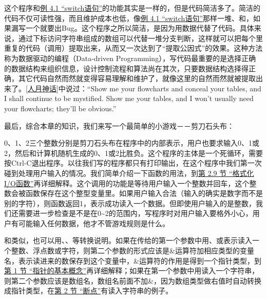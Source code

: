这个程序和\hyperlink{db.ch04s04.id2719574}{例 4.\BookSplit{}1 “switch语句”}的功能其实是一样的，但是代码简洁多了。简洁的代码不仅可读性强，而且维护成本也低，像\hyperlink{db.ch04s04.id2719574}{例 4.\BookSplit{}1 “switch语句”}那样一堆、和，如果漏写一个就要出Bug。这个程序之所以简洁，是因为用数据代替了代码。具体来说，通过下标访问字符串组成的数组可以代替一堆分支判断，这样就可以把每个里重复的代码（调用）提取出来，从而又一次达到了“提取公因式”的效果。这种方法称为数据驱动的编程（Data-driven Programming），写代码最重要的是选择正确的数据结构来组织信息，设计控制流程和算法尚在其次，只要数据结构选择得正确，其它代码自然而然就变得容易理解和维护了，就像这里的自然而然就被提取出来了。\hyperlink{db.bi01.bibli.manmonth}{[人月神话]}中说过：“Show me your flowcharts and conceal your tables, and I shall continue to be mystified.\BookSplit{} Show me your tables, and I won't usually need your flowcharts; they'll be obvious.\BookSplit{}”



最后，综合本章的知识，我们来写一个最简单的小游戏－－剪刀石头布：





0、1、2三个整数分别是剪刀石头布在程序中的内部表示，用户也要求输入0、1或2，然后和计算机随机生成的0、1或2比胜负。这个程序的主体是一个死循环，需要按Ctrl-C退出程序。以往我们写的程序都只有打印输出，在这个程序中我们第一次碰到处理用户输入的情况。我们简单介绍一下函数的用法，到\hyperlink{db.ch25s02.id2832755}{第 2.\BookSplit{}9 节 “格式化I/\BookSplit{}O函数”}再详细解释。这个调用的功能是等待用户输入一个整数并回车，这个整数会被函数保存在这个整型变量里。如果用户输入合法（输入的确实是数字而不是别的字符），则函数返回1，表示成功读入一个数据。但即使用户输入的是整数，我们还需要进一步检查是不是在0\textasciitilde{}\BookSplit{}2的范围内，写程序时对用户输入要格外小心，用户有可能输入任何数据，他才不管游戏规则是什么。



和类似，也可以用、、等转换说明。如果在传给的第一个参数中用、或表示读入一个整数、浮点数或字符，则第二个参数的形式应该是\&运算符加相应类型的变量名，表示读进来的数保存到这个变量中，\&运算符的作用是得到一个指针类型，到\hyperlink{db.ch23s01.id2809880}{第 1 节 “指针的基本概念”}再详细解释；如果在第一个参数中用读入一个字符串，则第二个参数应该是数组名，数组名前面不加\&，因为数组类型做右值时自动转换成指针类型，在\hyperlink{db.ch10s02.id2741278}{第 2 节 “断点”}有读入字符串的例子。



